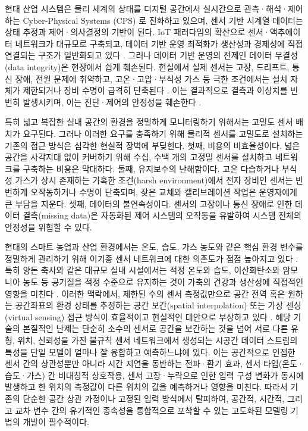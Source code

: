 \documentclass[final,5p,times,twocolumn,authoryear]{elsarticle}
\begin{document}
현대 산업 시스템은 물리 세계의 상태를 디지털 공간에서 실시간으로 관측·해석·제어하는 Cyber-Physical Systems (CPS) \cite{lee2008isorc_cps, rajkumar_cyber-physical_2010}로 진화하고 있으며, 센서 기반 시계열 데이터는 상태 추정과 제어·의사결정의 기반이 된다. IoT 패러다임의 확산으로 센서·액추에이터 네트워크가 대규모로 구축되고, 데이터 기반 운영 최적화가 생산성과 경제성에 직접 연결되는 구조가 일반화되고 있다 \cite{gubbi_internet_2013}. 그러나 데이터 기반 운영의 전제인 데이터 무결성(data integrity)은 현장에서 쉽게 훼손된다. 현실에서 실제 센서는 고장, 드리프트, 통신 장애, 전원 문제에 취약하고, 고온·고압·부식성 가스 등 극한 조건에서는 설치 자체가 제한되거나 장비 수명이 급격히 단축된다 \cite{isermann_model-based_2005}. 이는 결과적으로 결측과 이상치를 빈번히 발생시키며, 이는 진단·제어의 안정성을 훼손한다 \cite{agbo_missing_2022}. 


특히 넓고 복잡한 실내 공간의 환경을 정밀하게 모니터링하기 위해서는 고밀도 센서 배치가 요구된다. 그러나 이러한 요구를 충족하기 위해 물리적 센서를 고밀도로 설치하는 기존의 접근 방식은 심각한 현실적 장벽에 부딪힌다. 첫째, 비용의 비효율성이다. 넓은 공간을 사각지대 없이 커버하기 위해 수십, 수백 개의 고정밀 센서를 설치하고 네트워크를 구축하는 비용은 막대하다. 둘째, 유지보수의 난해함이다. 고온 다습하거나 부식성 가스가 상시 존재하는 가혹한 조건(harsh environment)에서 전자 장비인 센서는 빈번하게 오작동하거나 수명이 단축되며, 잦은 교체와 캘리브레이션 작업은 운영자에게 큰 부담을 지운다. 셋째, 데이터의 불연속성이다. 센서의 고장이나 통신 장애로 인한 데이터 결측(missing data)은 자동화된 제어 시스템의 오작동을 유발하여 시스템 전체의 안정성을 위협할 수 있다.

현대의 스마트 농업과 산업 환경에서는 온도, 습도, 가스 농도와 같은 핵심 환경 변수를 정밀하게 관리하기 위해 이기종 센서 네트워크에 대한 의존도가 점점 높아지고 있다 \cite{wolfert_big_2017}. 특히 양돈 축사와 같은 대규모 실내 시설에서는 적정 온도와 습도, 이산화탄소와 암모니아 농도 등 공기질을 적정 수준으로 유지하는 것이 가축의 건강과 생산성에 직접적인 영향을 미친다 \cite{costa_ammonia_2017, drummond_effects_1980}. 이러한 맥락에서, 제한된 수의 센서 측정값만으로 공간 전역 혹은 원하는 공간좌표의 환경 상태를 추정하는 공간 보간(spatial interpolation) 또는 가상 센싱(virtual sensing) 접근 방식이 효율적이고 현실적인 대안으로 부상하고 있다 \cite{ploennigs_virtual_2011}. 해당 기술의 본질적인 난제는 단순히 소수의 센서로 공간을 보간하는 것을 넘어 서로 다른 유형, 위치, 신뢰성을 가진 불규칙 센서 네트워크에서 생성되는 시공간 데이터 스트림의 특성을 단일 모델이 얼마나 잘 융합하고 예측하느냐에 있다. 이는 공간적으로 인접한 센서 간의 상관성뿐만 아니라 시간 지연을 동반하는 전파·환기 효과, 센서 타입(온도·습도·가스) 간 비대칭적 상호작용, 센서 고장·누락으로 인한 입력 구성 변화가 동시에 발생하고 한 위치의 측정값이 다른 위치의 값을 예측하거나 영향을 미친다. 따라서 기존의 단순한 공간 상관 가정이나 고정된 입력 방식에서 탈피하여, 공간적, 시간적, 그리고 교차 변수 간의 유기적인 종속성을 통합적으로 포착할 수 있는 고도화된 모델링 기법의 개발이 필수적이다.
\end{document}
